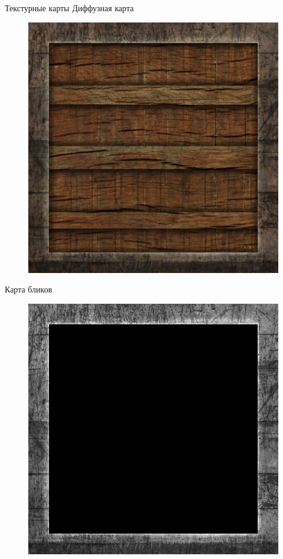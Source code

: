\documentclass[aspectration=1610,t]{beamer}
\begin{document}
\begin{frame}[fragile]{Текстурные карты}
    Диффузная карта
    \begin{figure}[htp]
        \centering
        \includegraphics[scale=0.20]{res/diffuse_comp}
    \end{figure}
    Карта бликов
    \begin{figure}[htp]
        \centering
        \includegraphics[scale=0.20]{res/specular_comp}
    \end{figure}
\end{frame}
\end{document}
